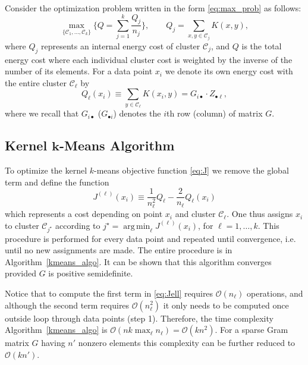 \documentclass[aps,preprint,nofootinbib,floatfix]{revtex4-1}
\DeclareMathOperator*{\argmin}{arg\,min}
\newcommand\kk{K}
\newcommand\C{{\mathcal{C}}}
\newcommand\OO{{\mathcal{O}}}
\begin{document}
Consider the optimization problem 
written in the form \eqref{eq:max_prob} as follows:
\begin{equation}
\label{eq:maxQ}
\max_{\{ \C_1,\dotsc,\C_k \}} 
\bigg\{ Q = \sum_{j=1}^k \dfrac{Q_j}{n_j}  \bigg\},
\qquad Q_j = \sum_{x,y\in\C_j} \kk(x,y),
\end{equation}
where $Q_j$ represents an internal energy cost of cluster $\C_j$, and
$Q$ is the total energy cost where each individual cluster cost 
is weighted by the inverse
of the number of its elements. For a data point $x_i$ we denote
its own energy cost
with the entire cluster $\C_\ell$ by
\begin{equation}
\label{eq:costxij}
Q_\ell(x_i) \equiv \sum_{y\in\C_\ell} \kk(x_i, y) = 
G_{i \bullet} \cdot Z_{\bullet \ell},
\end{equation}
where we recall that $G_{i\bullet}$ ($G_{\bullet i}$) denotes
the $i$th row (column) of matrix $G$.

\subsection*{Kernel $\bm{k}$-Means Algorithm}

To optimize the kernel $k$-means objective function
\eqref{eq:J} we remove the global term and define the function
\begin{equation}
\label{eq:Jell}
J^{(\ell)}(x_i) \equiv 
\dfrac{1}{n_\ell^2} Q_\ell
-\dfrac{2}{n_\ell} Q_\ell(x_i) 
\end{equation}
which represents a cost depending on point $x_i$ and cluster $\C_\ell$. One
thus assigns  $x_i$ to cluster $\C_{j^\star}$ according
to $j^\star = \argmin_\ell J^{(\ell)}(x_i)$, for $\ell = 1,\dotsc,k$.
This procedure is performed for every data point and repeated until
convergence, i.e. until no new assignments are made.
The entire procedure is in Algorithm~\ref{kmeans_algo}.
It can be shown that this algorithm converges provided $G$ is positive
semidefinite.

Notice that to compute the first term in \eqref{eq:Jell} requires
$\OO(n_\ell)$ operations, and although the second term requires
$\OO(n_\ell^2)$ it only needs to be computed once outside loop through
data points (step 1).
Therefore, the time complexity Algorithm~\ref{kmeans_algo} is
$\OO(n k \max_\ell n_\ell) = \OO(k n^2)$. For a sparse
Gram matrix $G$ having
$n'$ nonzero elements this complexity can be further reduced
to $\OO(k n')$. 
\end{document}
